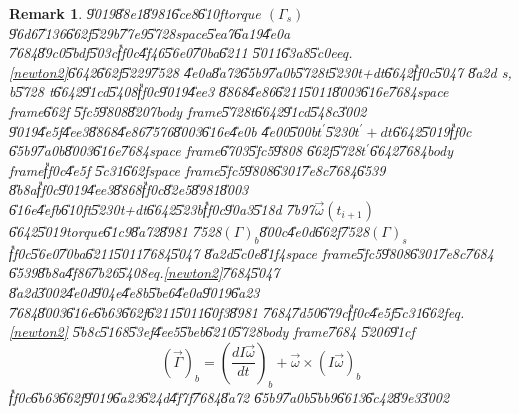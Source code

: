 \documentclass[12pt]{article}
\newtheorem{remark}[theorem]{Remark}
\begin{document}
\begin{remark}
\U{9019}\U{88e1}\U{8981}\U{6ce8}\U{610f}torque $\left( \Gamma _{s}\right) $%
\U{96d6}\U{7136}\U{662f}\U{529b}\U{77e9}\U{5728}space\U{5ea7}\U{6a19}\U{4e0a}%
\U{7684}\U{89c0}\U{5bdf}\U{503c}\U{ff0c}\U{4f46}\U{56e0}\U{70ba}\U{6211}%
\U{5011}\U{63a8}\U{5c0e}eq.\ref{newton2}\U{6642}\U{662f}\U{5229}\U{7528}%
\U{4e0a}\U{8a72}\U{65b9}\U{7a0b}\U{5728}t\U{5230}t+dt\U{6642}\U{ff0c}\U{5047}%
\U{8a2d} s, b\U{5728} t\U{6642}\U{91cd}\U{5408}\U{ff0c}\U{9019}\U{4ee3}%
\U{8868}\U{4e86}\U{6211}\U{5011}\U{8003}\U{616e}\U{7684}space frame\U{662f}%
\U{5fc5}\U{9808}\U{8207}body frame\U{5728}t\U{6642}\U{91cd}\U{548c}\U{3002}%
\U{9019}\U{4e5f}\U{4ee3}\U{8868}\U{4e86}\U{7576}\U{8003}\U{616e}\U{4e0b}%
\U{4e00}\U{500b}$t^{\prime }$\U{5230}$t^{\prime }+dt$\U{6642}\U{5019}\U{ff0c}%
\U{65b9}\U{7a0b}\U{8003}\U{616e}\U{7684}space frame\U{6703}\U{5fc5}\U{9808}%
\U{662f}\U{5728}$t^{\prime }$\U{6642}\U{7684}body frame\U{ff0c}\U{4e5f}%
\U{5c31}\U{662f}space frame\U{5fc5}\U{9808}\U{6301}\U{7e8c}\U{7684}\U{6539}%
\U{8b8a}\U{ff0c}\U{9019}\U{4ee3}\U{8868}\U{ff0c}\U{82e5}\U{8981}\U{8003}%
\U{616e}\U{4efb}\U{610f}t\U{5230}t+dt\U{6642}\U{523b}\U{ff0c}\U{90a3}\U{518d}%
\U{7b97}$\vec{\omega}(t_{i+1})$\U{6642}\U{5019}torque\U{61c9}\U{8a72}\U{8981}%
\U{7528}$\left( \Gamma \right) _{b}$\U{800c}\U{4e0d}\U{662f}\U{7528}$\left(
\Gamma \right) _{s}$\U{ff0c}\U{56e0}\U{70ba}\U{6211}\U{5011}\U{7684}\U{5047}%
\U{8a2d}\U{5c0e}\U{81f4}space frame\U{5fc5}\U{9808}\U{6301}\U{7e8c}\U{7684}%
\U{6539}\U{8b8a}\U{4f86}\U{7b26}\U{5408}eq.\ref{newton2}\U{7684}\U{5047}%
\U{8a2d}\U{3002}\U{4e0d}\U{904e}\U{4e8b}\U{5be6}\U{4e0a}\U{9019}\U{6a23}%
\U{7684}\U{8003}\U{616e}\U{6b63}\U{662f}\U{6211}\U{5011}\U{60f3}\U{8981}%
\U{7684}\U{7d50}\U{679c}\U{ff0c}\U{4e5f}\U{5c31}\U{662f}eq.\ref{newton2}%
\U{5b8c}\U{5168}\U{53ef}\U{4ee5}\U{5beb}\U{6210}\U{5728}body frame\U{7684}%
\U{5206}\U{91cf}%
\begin{equation}
\left( \vec{\Gamma}\right) _{b}=\left( \frac{dI\vec{\omega}}{dt}\right) _{b}+%
\vec{\omega}\times \left( I\vec{\omega}\right) _{b}
\end{equation}%
\U{ff0c}\U{6b63}\U{662f}\U{9019}\U{6a23}\U{624d}\U{4f7f}\U{7684}\U{8a72}%
\U{65b9}\U{7a0b}\U{5bb9}\U{6613}\U{6c42}\U{89e3}\U{3002}
\end{remark}
\end{document}
